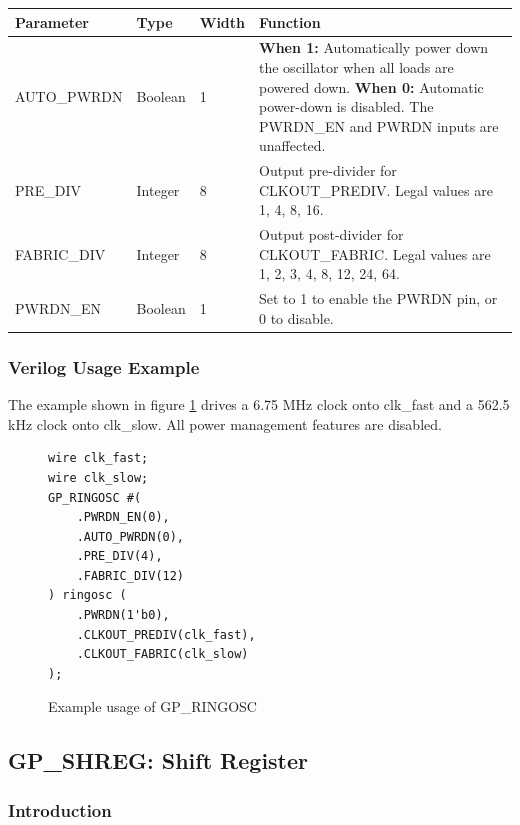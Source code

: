 \documentclass[11pt]{article}
\begin{document}
\begin{tabularx}{5in}{|l|l|l|X|}
\hline
{\bfseries Parameter} & {\bfseries Type} & {\bfseries Width} & {\bfseries Function} \\
\hline
AUTO\_PWRDN & Boolean & 1 & 
	{\bfseries When 1: } \newline Automatically power down the oscillator when all loads are powered down. \newline
	{\bfseries When 0: } \newline Automatic power-down is disabled. The PWRDN\_EN and PWRDN inputs are unaffected.\\
\hline
PRE\_DIV & Integer & 8 &
	Output pre-divider for CLKOUT\_PREDIV. Legal values are 1, 4, 8, 16. \\
\hline
FABRIC\_DIV & Integer & 8 &
	Output post-divider for CLKOUT\_FABRIC. Legal values are 1, 2, 3, 4, 8, 12, 24, 64. \\
\hline
PWRDN\_EN & Boolean & 1 & Set to 1 to enable the PWRDN pin, or 0 to disable. \\
\hline
\end{tabularx}

\pagebreak
\subsubsection{Verilog Usage Example}

The example shown in figure \ref{gp-ringosc-example} drives a 6.75 MHz clock onto clk\_fast and a 562.5 kHz clock onto 
clk\_slow. All power management features are disabled.

\begin{figure}[h]
\begin{lstlisting}
wire clk_fast;
wire clk_slow;
GP_RINGOSC #(
	.PWRDN_EN(0),
	.AUTO_PWRDN(0),
	.PRE_DIV(4),
	.FABRIC_DIV(12)
) ringosc (
	.PWRDN(1'b0),
	.CLKOUT_PREDIV(clk_fast),
	.CLKOUT_FABRIC(clk_slow)
);
\end{lstlisting}
\caption{Example usage of GP\_RINGOSC}
\label{gp-ringosc-example}
\end{figure}


\pagebreak
\clearpage
\subsection{GP\_SHREG: Shift Register}

\subsubsection{Introduction}
\end{document}
